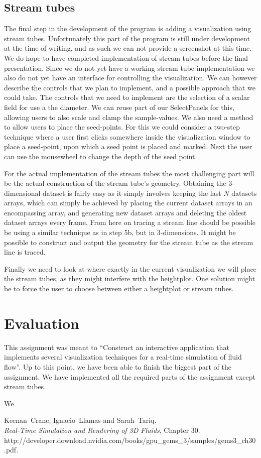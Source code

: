 \documentclass[a4paper,11pt,twoside]{report}
\begin{document}
	\section{Stream tubes}
		The final step in the development of the program is adding a visualization using stream tubes. Unfortunately this part of the program is still under development at the time of writing, and as such we can not provide a screenshot at this time. We do hope to have completed implementation of stream tubes before the final presentation.
		Since we do not yet have a working stream tube implementation we also do not yet have an interface for controlling the visualization. We can however describe the controls that we plan to implement, and a possible approach that we could take. The controls that we need to implement are the selection of a scalar field for use a the diameter. We can reuse part of our SelectPanels for this, allowing users to also scale and clamp the sample-values. We also need a method to allow users to place the seed-points. For this we could consider a two-step technique where a user first clicks somewhere inside the visualization window to place a seed-point, upon which a seed point is placed and marked. Next the user can use the mousewheel to change the depth of the seed point.

		For the actual implementation of the stream tubes the most challenging part will be the actual construction of the stream tube's geometry. Obtaining the 3-dimensional dataset is fairly easy as it simply involves keeping the last $N$ datasets arrays, which can simply be achieved by placing the current dataset arrays in an encompassing array, and generating new dataset arrays and deleting the oldest dataset arrays every frame. From here on tracing a stream line should be possible be using a similar technique as in step 5b, but in 3-dimensions. It might be possible to construct and output the geometry for the stream tube as the stream line is traced.

		Finally we need to look at where exactly in the current visualization we will place the stream tubes, as they might interfere with the heightplot. One solution might be to force the user to choose between either a heightplot or stream tubes.
\chapter{Evaluation}
    This assignment was meant to ``Construct an interactive application that implements several visualization techniques for a real-time simulation of fluid flow''. Up to this point, we have been able to finish the biggest part of the assignment. We have implemented all the required parts of the assignment except stream tubes.
    
    We 
\begin{thebibliography}{99}
 Keenan~Crane, Ignacio~Llamas and Sarah~Tariq.\\
        \textit{Real-Time Simulation and Rendering of 3D Fluids}, Chapter 30.\\
        http://developer.download.nvidia.com/books/gpu\_gems\_3/samples/gems3\_ch30.pdf.\\
\end{thebibliography}
\end{document}
